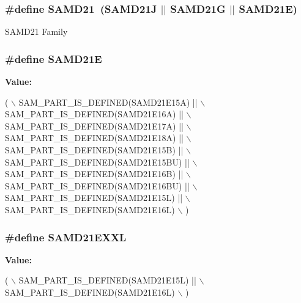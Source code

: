 \subsubsection[{S\+A\+M\+D21}]{\setlength{\rightskip}{0pt plus 5cm}\#define S\+A\+M\+D21~(S\+A\+M\+D21\+J $\vert$$\vert$ S\+A\+M\+D21\+G $\vert$$\vert$ S\+A\+M\+D21\+E)}\label{group__sam__part__macros__group_gab9217b15071242235d3014381d61dbf7}
S\+A\+M\+D21 Family \hypertarget{group__sam__part__macros__group_gaea4cafdd5e8defbc23a43eb5bb10578c}{}
\subsubsection[{S\+A\+M\+D21\+E}]{\setlength{\rightskip}{0pt plus 5cm}\#define S\+A\+M\+D21\+E}\label{group__sam__part__macros__group_gaea4cafdd5e8defbc23a43eb5bb10578c}
{\bfseries Value\+:}
\begin{DoxyCode}
( \(\backslash\)
        SAM\_PART\_IS\_DEFINED(SAMD21E15A) || \(\backslash\)
        SAM\_PART\_IS\_DEFINED(SAMD21E16A) || \(\backslash\)
        SAM\_PART\_IS\_DEFINED(SAMD21E17A) || \(\backslash\)
        SAM\_PART\_IS\_DEFINED(SAMD21E18A) || \(\backslash\)
        SAM\_PART\_IS\_DEFINED(SAMD21E15B) || \(\backslash\)
        SAM\_PART\_IS\_DEFINED(SAMD21E15BU) || \(\backslash\)
        SAM\_PART\_IS\_DEFINED(SAMD21E16B) || \(\backslash\)
        SAM\_PART\_IS\_DEFINED(SAMD21E16BU) || \(\backslash\)
        SAM\_PART\_IS\_DEFINED(SAMD21E15L) || \(\backslash\)
        SAM\_PART\_IS\_DEFINED(SAMD21E16L) \(\backslash\)
    )
\end{DoxyCode}
\hypertarget{group__sam__part__macros__group_ga41c43019594750ac3d6f0b210cd149f6}{}
\subsubsection[{S\+A\+M\+D21\+E\+X\+X\+L}]{\setlength{\rightskip}{0pt plus 5cm}\#define S\+A\+M\+D21\+E\+X\+X\+L}\label{group__sam__part__macros__group_ga41c43019594750ac3d6f0b210cd149f6}
{\bfseries Value\+:}
\begin{DoxyCode}
( \(\backslash\)
        SAM\_PART\_IS\_DEFINED(SAMD21E15L) || \(\backslash\)
        SAM\_PART\_IS\_DEFINED(SAMD21E16L) \(\backslash\)
        )
\end{DoxyCode}
\hypertarget{group__sam__part__macros__group_ga38b8f6ee1c68255f5fc157f564bb9db9}{}
